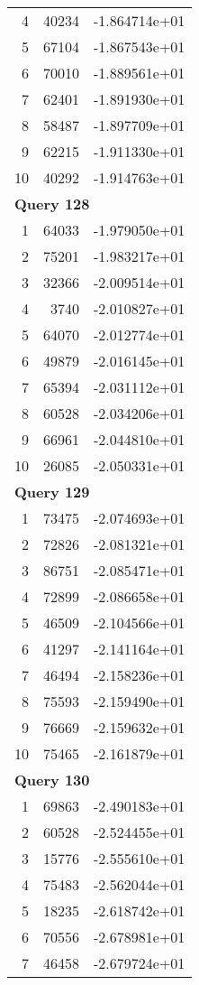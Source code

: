 \begin{longtable}[{p}]{@{}rrp{}@{}}
4 & 40234 & -1.864714e+01 \\
5 & 67104 & -1.867543e+01 \\
6 & 70010 & -1.889561e+01 \\
7 & 62401 & -1.891930e+01 \\
8 & 58487 & -1.897709e+01 \\
9 & 62215 & -1.911330e+01 \\
10 & 40292 & -1.914763e+01 \\
\midrule
\multicolumn{3}{l}{\bfseries Query 128} \\
1 & 64033 & -1.979050e+01 \\
2 & 75201 & -1.983217e+01 \\
3 & 32366 & -2.009514e+01 \\
4 & 3740 & -2.010827e+01 \\
5 & 64070 & -2.012774e+01 \\
6 & 49879 & -2.016145e+01 \\
7 & 65394 & -2.031112e+01 \\
8 & 60528 & -2.034206e+01 \\
9 & 66961 & -2.044810e+01 \\
10 & 26085 & -2.050331e+01 \\
\midrule
\multicolumn{3}{l}{\bfseries Query 129} \\
1 & 73475 & -2.074693e+01 \\
2 & 72826 & -2.081321e+01 \\
3 & 86751 & -2.085471e+01 \\
4 & 72899 & -2.086658e+01 \\
5 & 46509 & -2.104566e+01 \\
6 & 41297 & -2.141164e+01 \\
7 & 46494 & -2.158236e+01 \\
8 & 75593 & -2.159490e+01 \\
9 & 76669 & -2.159632e+01 \\
10 & 75465 & -2.161879e+01 \\
\midrule
\multicolumn{3}{l}{\bfseries Query 130} \\
1 & 69863 & -2.490183e+01 \\
2 & 60528 & -2.524455e+01 \\
3 & 15776 & -2.555610e+01 \\
4 & 75483 & -2.562044e+01 \\
5 & 18235 & -2.618742e+01 \\
6 & 70556 & -2.678981e+01 \\
7 & 46458 & -2.679724e+01 \\

\end{longtable}
